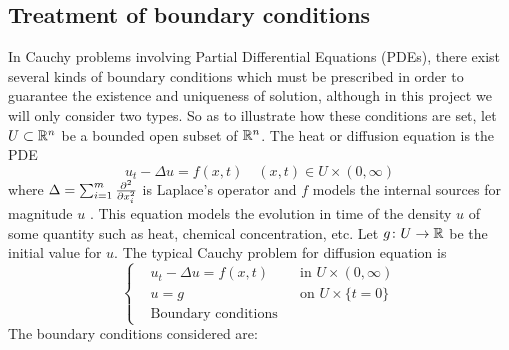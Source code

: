 \subsection{Treatment of boundary conditions}

In Cauchy problems involving Partial Differential Equations (PDEs), there exist
several kinds of boundary conditions which must be prescribed in order to
guarantee the existence and uniqueness of solution, although in this project
we will only consider two types. So as to illustrate how these conditions are set,
let $U \subset \mathbb{R}^n$ be a bounded open subset of $\mathbb{R}^n$. The heat or diffusion
equation is the PDE
\begin{equation} \label{eq:boundary_conditions_heat_equation}
	u_t - \Delta u = f(x, t) \quad (x, t) \in U \times (0,\infty)
\end{equation}
where $\Delta = \sum_{i=1}^{m} \pdv[2]{}{x_i}$ is Laplace's operator and $f$
models the internal sources for magnitude $u$ \cite{evans1998heat}. This equation models the
evolution in time of the density $u$ of some quantity such as heat, chemical
concentration, etc. Let $g \colon U \rightarrow \mathbb{R}$ be the
initial value for $u$. The typical Cauchy problem for diffusion equation is
\begin{equation} \label{eq:boundary_conditions_problem}
	\left\{
	\begin{aligned}
		&u_t - \Delta u = f(x, t) & &\text{in } U \times (0,\infty) \\
		&u = g & &\text{on } U \times \{ t = 0 \} \\
		&\text{Boundary conditions}
	\end{aligned}
	\right.
\end{equation}
The boundary conditions considered are:
